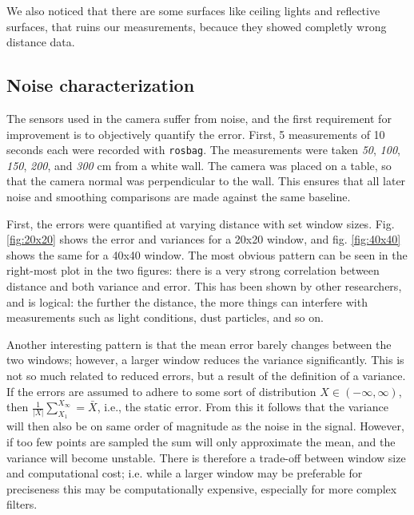 \documentclass[11pt]{article}
\begin{document}
We also noticed that there are some surfaces like ceiling lights and reflective 
surfaces, that ruins our measurements, becauce they showed completly wrong distance 
data. \par
	


\subsection{Noise characterization}

The sensors used in the camera suffer from noise, and the first requirement for
improvement is to objectively quantify the error. First, 5 measurements of 10
seconds each were recorded with \texttt{rosbag}. The measurements were taken
\emph{50}, \emph{100}, \emph{150}, \emph{200}, and \emph{300} cm from a white
wall. The camera was placed on a table, so that the camera normal was
perpendicular to the wall. This ensures that all later noise and smoothing
comparisons are made against the same baseline. \par

First, the errors were quantified at varying distance with set window
sizes. Fig. \vref{fig:20x20} shows the error and variances for a 20x20 window,
and fig. \vref{fig:40x40} shows the same for a 40x40 window. The most obvious
pattern can be seen in the right-most plot in the two figures: there is a very
strong correlation between distance and both variance and error. This has been
shown by other researchers, and is logical: the further the distance, the more
things can interfere with measurements such as light conditions, dust particles,
and so on. \par

Another interesting pattern is that the mean error barely changes between the
two windows; however, a larger window reduces the variance significantly. This
is not so much related to reduced errors, but a result of the definition of a
variance. If the errors are assumed to adhere to some sort of distribution
$X \in \left(-\infty, \infty \right)$, then $\frac{1}{\left|X\right|}\sum_{X_1}^{X_\infty} = \bar{X}$,
i.e., the static error. From this it follows that the variance will then also be
on same order of magnitude as the noise in the signal. However, if too few
points are sampled the sum will only approximate the mean, and the variance will
become unstable. There is therefore a trade-off between window size and
computational cost; i.e. while a larger window may be preferable for preciseness
this may be computationally expensive, especially for more complex filters. \par
\end{document}
